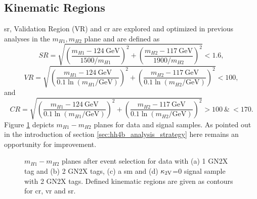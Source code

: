 \subsection{Kinematic Regions}\label{sec:kinematic_regions}
\ac{sr}, Validation Region (VR) and \ac{cr} are explored and optimized in previous analyses \citep{aad2023search,ATL-COM-PHYS-2023-033} in the $m_{H1},m_{H2}$ plane and are defined as
\begin{equation}
    SR =  \sqrt{\left(\frac{m_{H1} - \SI{124}{\GeV}}{1500 / m_{H1}}\right)^{2} + \left(\frac{m_{H2} - \SI{117}{\GeV}}{1900 / m_{H2}}\right)^{2}} < 1.6,
\end{equation}
\begin{equation}
    \label{VR_Xhh}
    VR =  \sqrt{\left(\frac{m_{H1} - \SI{124}{\GeV}}{0.1 \ln(m_{H1}/\text{GeV})}\right)^{2} + \left(\frac{m_{H2} - \SI{117}{\GeV}}{0.1 \ln(m_{H2}/\text{GeV})}\right)^{2}} < 100,
\end{equation}
and
\begin{equation}
    \label{CR_Xhh}
    CR = \sqrt{\left(\frac{m_{H1} - \SI{124}{\GeV}}{0.1 \ln(m_{H1}/\text{GeV})}\right)^{2} + \left(\frac{m_{H2} - \SI{117}{\GeV}}{0.1 \ln(m_{H2}/\text{GeV})}\right)^{2}} > 100  \ \& \ < 170.
\end{equation}
Figure \ref{fig:m_hh_plane} depicts $m_{H1}-m_{H2}$ planes for data and signal samples. As pointed out in the introduction of section \ref{sec:hh4b_analysis_strategy} here remains an opportunity for improvement.
\begin{figure}
    \centering
    \caption[]{ $m_{H1}-m_{H2}$ planes after event selection for data with (a) 1 GN2X tag and (b) 2 GN2X tags, (c) a \ac{sm} and (d) $\kappa_{\text{2V}}$=0 signal sample with 2 GN2X tags. Defined kinematic regions are given as contours for \ac{cr}, \ac{vr} and \ac{sr}.}
    \label{fig:m_hh_plane}
\end{figure}

